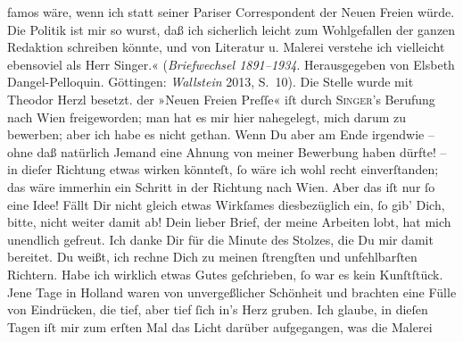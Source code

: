 \begin{ledgroupsized}[t]{13cm}
{{{                        famos wäre, wenn ich statt seiner Pariser Correspondent der Neuen
                           Freien würde. Die Politik ist mir so wurst, daß ich sicherlich
                        leicht zum Wohlgefallen der ganzen Redaktion schreiben könnte, und von Literatur u.
                        Malerei verstehe ich vielleicht ebensoviel als Herr Singer.« (\emph{Briefwechsel 1891–1934}. Herausgegeben von Elsbeth
                     Dangel-Pelloquin. Göttingen: \emph{Wallstein} 2013,
                     S. 10). Die Stelle wurde mit Theodor
                     Herzl besetzt.}}}\label{K_L02668-5h} der »Neuen Freien
                  Preſſe« iſt durch \textsc{Singer}’s Berufung nach {\pb}Wien freigeworden; man hat es mir hier nahegelegt,
               mich darum zu bewerben; aber ich habe es nicht gethan. Wenn Du aber am Ende irgendwie
               – ohne daß natürlich Jemand eine Ahnung von meiner Bewerbung haben dürfte! – in
               dieſer Richtung etwas wirken könnteſt, ſo wäre ich wohl recht einverſtanden; das wäre
               immerhin ein Schritt in der Richtung nach Wien.
               Aber das iſt nur ſo eine Idee! Fällt Dir nicht gleich etwas Wirkſames
                  diesbezüglich\strikeout{\textcolor{gray}{er}} ein, ſo gib’ Dich, bitte, nicht weiter damit ab! {\dotsfour}
               Dein lieber Brief, der meine Arbeiten lobt, hat mich unendlich gefreut. Ich danke Dir
               für die Minute des Stolzes, die Du mir damit bereitet. Du weißt, ich rechne Dich zu
               meinen ſtrengſten und unfehlbarſten Richtern. Habe ich wirklich etwas Gutes
               geſchrieben, ſo war es kein Kunſtſtück. Jene Tage in Holland waren von unvergeßlicher Schönheit und brachten eine Fülle von
               Eindrücken, die tief,  aber tief ſich in’s Herz gruben. Ich glaube, in
               dieſen Tagen iſt mir zum erſten Mal das Licht darüber aufgegangen, was die Malerei

\end{ledgroupsized}
